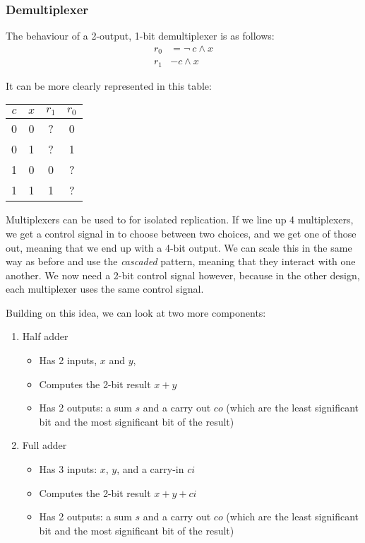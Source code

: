 \documentclass[11pt,a4paper,titlepage,dvipsnames,cmyk]{scrartcl}
\begin{document}
\subsubsection{Demultiplexer}%
\label{ssub:Demultiplexer}

The behaviour of a 2-output, 1-bit demultiplexer is as follows:
\begin{align*}
    r_0 &= \neg \ c \wedge x \\
    r_1 &- c \wedge x
\end{align*}

It can be more clearly represented in this table:
\begin{center}
    \begin{tabular}{|c c|c c|}
        \hline
        $c$ & $x$ & $r_1$ & $r_0$ \\ \hline
        0 & 0 & ? & 0 \\ \hline
        0 & 1 & ? & 1 \\ \hline
        1 & 0 & 0 & ? \\ \hline
        1 & 1 & 1 & ? \\ \hline
    \end{tabular}
\end{center}

Multiplexers can be used to for isolated replication. If we line up 4
multiplexers, we get a control signal in to choose between two choices,
and we get one of those out, meaning that we end up with a 4-bit output.
We can scale this in the same way as before and use the \textit{cascaded}
pattern, meaning that they interact with one another. We now need a 2-bit
control signal however, because in the other design, each multiplexer uses
the same control signal.

Building on this idea, we can look at two more components:
\begin{enumerate}
    \item Half adder
        \begin{itemize}
            \item Has 2 inputs, $x$ and $y$,
            \item Computes the 2-bit result $x + y$
            \item Has 2 outputs: a sum $s$ and a carry out $co$ (which are
                the least significant bit and the most significant bit of
                the result)
        \end{itemize}
    \item Full adder
        \begin{itemize}
            \item Has 3 inputs: $x$, $y$, and a carry-in $ci$
            \item Computes the 2-bit result $x + y + ci$
            \item Has 2 outputs: a sum $s$ and a carry out $co$ (which are
                the least significant bit and the most significant bit of
                the result)
        \end{itemize}
\end{enumerate}
\end{document}
